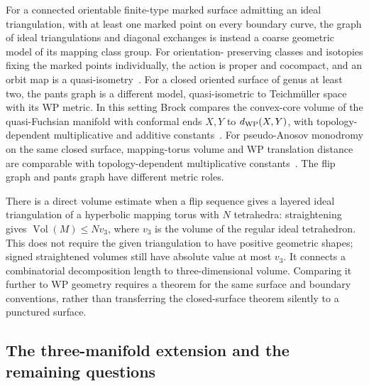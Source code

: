 For a connected orientable finite-type marked surface admitting an ideal
triangulation, with at least one marked point on every boundary curve,
the graph of ideal triangulations and diagonal exchanges is instead
a coarse geometric model of its mapping class group. For orientation-
preserving classes and isotopies fixing the marked points individually,
the action is proper and cocompact, and an
orbit map is a quasi-isometry~\cite[Section~2.1, Lemma~2.3]{DisarloParlier}.
For a closed oriented surface of genus at least two, the pants graph is
a different model, quasi-isometric to Teichm\"uller space with its WP
metric. In this setting Brock compares the convex-core volume of the
quasi-Fuchsian manifold with conformal ends $X,Y$ to $d_{\rm WP}(X,Y)$,
with topology-dependent multiplicative and additive
constants~\cite[Theorems~1.1--1.2]{BrockWPVolumes}.
For pseudo-Anosov monodromy on the same closed surface, mapping-torus
volume and WP translation distance are comparable with topology-dependent
multiplicative constants~\cite[Theorem~1.1]{BrockMappingTori}.
The flip graph and pants graph have different metric roles.

There is a direct volume estimate when a flip sequence gives a layered
ideal triangulation of a hyperbolic mapping torus with $N$ tetrahedra:
straightening gives $\operatorname{Vol}(M)\le Nv_3$, where $v_3$ is the
volume of the regular ideal tetrahedron. This does not require the
given triangulation to have positive geometric shapes; signed
straightened volumes still have absolute value at most $v_3$.
It connects a combinatorial decomposition length to three-dimensional
volume. Comparing it further to WP geometry requires a theorem for the
same surface and boundary conventions, rather than transferring the
closed-surface theorem silently to a punctured surface.

\subsection{The three-manifold extension and the remaining questions}
\label{subsec:ipolyThreeManifolds}

